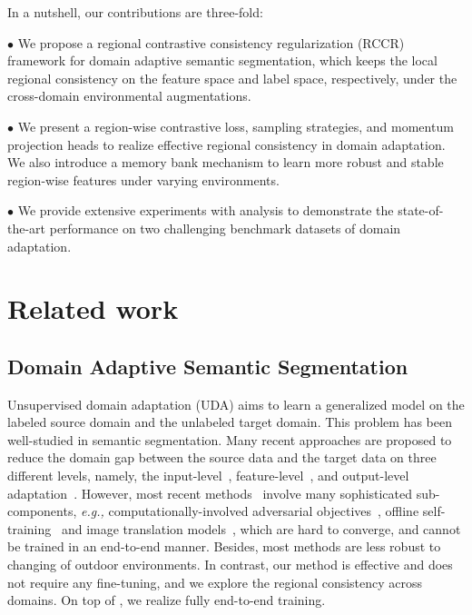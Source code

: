 \documentclass{article}
\begin{document}
In a nutshell, our contributions are three-fold: 

$\bullet$ We propose a regional contrastive consistency regularization (RCCR) framework for domain adaptive semantic segmentation, which keeps the local regional consistency on the feature space and label space, respectively, under the cross-domain environmental augmentations. 
    
$\bullet$ We present a region-wise contrastive loss, sampling strategies, and momentum projection heads to realize effective regional consistency in domain adaptation. We also introduce a memory bank mechanism to learn more robust and stable region-wise features under varying environments. 


$\bullet$ We provide extensive experiments with analysis to demonstrate the state-of-the-art performance on two challenging benchmark datasets of domain adaptation.


  
\section{Related work}


\subsection{Domain Adaptive Semantic Segmentation}

Unsupervised domain adaptation (UDA) aims to learn a generalized model on the labeled source domain and the unlabeled target domain. This problem has been well-studied in semantic segmentation. 
Many recent approaches are proposed to reduce the domain gap between the source data and the target data on three different levels,  namely, the input-level~\cite{BDL,LTIR,LDR}, feature-level~\cite{CBST,CRST}, and output-level adaptation~\cite{AdaptSegNet,SIM,CLANv2}.  
However, most recent methods~\cite{BDL,FDA,SIM,LTIR} involve many sophisticated sub-components, \emph{e.g.,} computationally-involved adversarial objectives~\cite{AdaptSegNet,SIM,CLANv2}, offline self-training~\cite{BDL,DAST,CBST,CRST} and image translation models~\cite{BDL,LTIR,LDR}, which are hard to converge, and cannot be trained in an end-to-end manner. Besides, most methods are  less  robust  to changing of outdoor environments.
In contrast, our method is effective and does not require any fine-tuning, and we explore the regional consistency across domains.  On top of \cite{tranheden2020dacs}, we realize fully end-to-end training.
\end{document}
